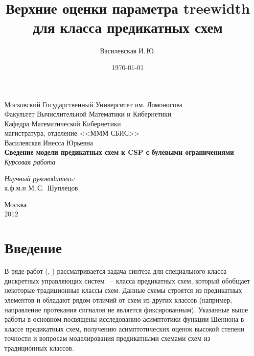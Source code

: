 \documentclass[12pt]{article}
\title{Верхние оценки параметра treewidth для класса предикатных схем}
\author{Василевская И.\,Ю.}
\date{\today}
\begin{document}
    \begin{titlepage}
        \begin{center}
            Московский Государственный Университет им. Ломоносова\\
            Факультет Вычислительной Математики и Кибернетики\\
            Кафедра Математической Кибернетики\\
            магистратура, отделение <<МММ СБИС>>\\[6cm]

            \large {Василевская Инесса Юрьевна}\\
            \LARGE \textbf {Сведение модели предикатных схем к CSP с булевыми ограничениями}\\[0.8cm]
            \large \emph {Курсовая работа}\\[5.0cm]

            \begin{flushright}
                \large
                \begin{minipage}{0.40\textwidth}
                    \begin{flushleft}
                        \emph{Научный руководитель:}\\к.ф.м.н М.\,С.~Шуплецов
                    \end{flushleft}
                \end{minipage}
            \end{flushright}

            \vfill
            Москва\\
			2012
        \end{center}
    \end{titlepage}

\setcounter{page}{2}

\section{Введение}
\label{beginning}
В ряде работ (\cite{Shu09}, \cite{Shu11}) рассматривается задача синтеза для специального класса дискретных управляющих систем ~--
класса предикатных схем, который обобщает некоторые традиционные классы схем. Данные схемы строятся из предикатных элементов
и обладают рядом отличий от схем из других классов (например, направление протекания сигналов не является фиксированным).
Указанные выше работы в основном посвящены исследованию асимптотики функции Шеннона в классе предикатных схем,
 получению асимптотических оценок высокой степени точности и вопросам моделирования предикатными схемами схем из традиционных классов.
\end{document}
